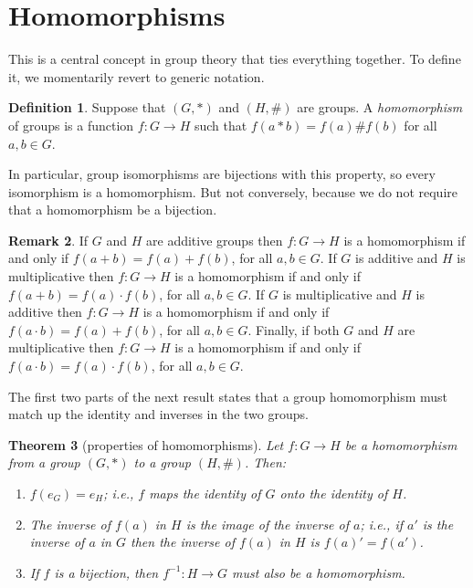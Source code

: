 \documentclass[11pt]{article}
\newtheorem{thm}{Theorem}[section]
\theoremstyle{definition}
\newtheorem{defn}[thm]{Definition}
\newtheorem{rmk}[thm]{Remark}
\begin{document}
\newpage
\section{Homomorphisms}\noindent
This is a central concept in group theory that ties everything
together. To define it, we momentarily revert to generic notation.

\begin{defn}
  Suppose that $(G,*)$ and $(H,\#)$ are groups. A \emph{homomorphism}
  of groups is a function $f: G \to H$ such that $f(a*b) = f(a)\#
  f(b)$ for all $a,b \in G$.
\end{defn}

In particular, group isomorphisms  are bijections
with this property, so every isomorphism is a homomorphism. But not
conversely, because we do not require that a homomorphism be a
bijection.

\begin{rmk}
If $G$ and $H$ are additive groups then $f: G \to H$ is a homomorphism
if and only if $f(a+b) = f(a)+f(b)$, for all $a,b \in G$. If $G$ is
additive and $H$ is multiplicative then $f: G \to H$ is a homomorphism
if and only if $f(a+b) = f(a) \cdot f(b)$, for all $a,b \in G$. If $G$
is multiplicative and $H$ is additive then $f: G \to H$ is a
homomorphism if and only if $f(a\cdot b) = f(a) + f(b)$, for all $a,b
\in G$. Finally, if both $G$ and $H$ are multiplicative then $f: G \to
H$ is a homomorphism if and only if $f(a \cdot b) = f(a) \cdot f(b)$,
for all $a,b \in G$.
\end{rmk}

The first two parts of the next result states that a group
homomorphism must match up the identity and inverses in the two
groups.

\begin{thm}[properties of homomorphisms]\label{homprop}
  Let $f:G \to H$ be a homomorphism from a group $(G,*)$ to a group
  $(H,\#)$. Then:
\begin{enumerate}
\item $f(e_G) = e_H$; i.e., $f$ maps the identity of $G$ onto
  the identity of $H$.

\item The inverse of $f(a)$ in $H$ is the image of the inverse of $a$;
  i.e., if $a'$ is the inverse of $a$ in $G$ then the inverse of
  $f(a)$ in $H$ is $f(a)' = f(a')$.

\item[(c)] If $f$ is a bijection, then $f^{-1}: H \to G$ must also be a
  homomorphism.
\end{enumerate}
\end{thm}
\end{document}
